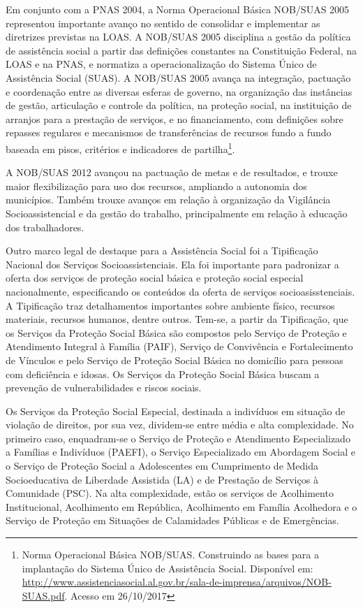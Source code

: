 \documentclass[
  letterpaper,
  DIV=11,
  numbers=noendperiod]{scrreprt}
\begin{document}
Em conjunto com a PNAS 2004, a Norma Operacional Básica NOB/SUAS 2005
representou importante avanço no sentido de consolidar e implementar as
diretrizes previstas na LOAS. A NOB/SUAS 2005 disciplina a gestão da
política de assistência social a partir das definições constantes na
Constituição Federal, na LOAS e na PNAS, e normatiza a operacionalização
do Sistema Único de Assistência Social (SUAS). A NOB/SUAS 2005 avança na
integração, pactuação e coordenação entre as diversas esferas de
governo, na organização das instâncias de gestão, articulação e controle
da política, na proteção social, na instituição de arranjos para a
prestação de serviços, e no financiamento, com definições sobre repasses
regulares e mecanismos de transferências de recursos fundo a fundo
baseada em pisos, critérios e indicadores de partilha\footnote{Norma
  Operacional Básica NOB/SUAS. Construindo as bases para a implantação
  do Sistema Único de Assistência Social. Disponível em:
  \url{http://www.assistenciasocial.al.gov.br/sala-de-imprensa/arquivos/NOB-SUAS.pdf}.
  Acesso em 26/10/2017}.

A NOB/SUAS 2012 avançou na pactuação de metas e de resultados, e trouxe
maior flexibilização para uso dos recursos, ampliando a autonomia dos
municípios. Também trouxe avanços em relação à organização da Vigilância
Socioassistencial e da gestão do trabalho, principalmente em relação à
educação dos trabalhadores.

Outro marco legal de destaque para a Assistência Social foi a
Tipificação Nacional dos Serviços Socioassistenciais. Ela foi importante
para padronizar a oferta dos serviços de proteção social básica e
proteção social especial nacionalmente, especificando os conteúdos da
oferta de serviços socioasisstenciais. A Tipificação traz detalhamentos
importantes sobre ambiente físico, recursos materiais, recursos humanos,
dentre outros. Tem-se, a partir da Tipificação, que os Serviços da
Proteção Social Básica são compostos pelo Serviço de Proteção e
Atendimento Integral à Família (PAIF), Serviço de Convivência e
Fortalecimento de Vínculos e pelo Serviço de Proteção Social Básica no
domicílio para pessoas com deficiência e idosas. Os Serviços da Proteção
Social Básica buscam a prevenção de vulnerabilidades e riscos sociais.

Os Serviços da Proteção Social Especial, destinada a indivíduos em
situação de violação de direitos, por sua vez, dividem-se entre média e
alta complexidade. No primeiro caso, enquadram-se o Serviço de Proteção
e Atendimento Especializado a Famílias e Indivíduos (PAEFI), o Serviço
Especializado em Abordagem Social e o Serviço de Proteção Social a
Adolescentes em Cumprimento de Medida Socioeducativa de Liberdade
Assistida (LA) e de Prestação de Serviços à Comunidade (PSC). Na alta
complexidade, estão os serviços de Acolhimento Institucional,
Acolhimento em República, Acolhimento em Família Acolhedora e o Serviço
de Proteção em Situações de Calamidades Públicas e de Emergências.
\end{document}

